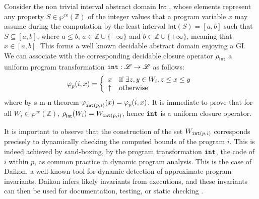 \documentclass[runningheads]{llncs}
\def\ok#1{\mbox{\raisebox{0ex}[1ex][1ex]{$#1$}}}
\def\wpre{\wp^{\text{ce}}}
\newcommand{\ccL}{\mathscr{L}}
\newcommand{\pfunction}[3]{\ok{\varphi^{#2\, #3}_{#1}}}
\newcommand{\auco}[2]{\ok{\rho^{#1}_{#2}}}
\newcommand{\ra}{\rightarrow}
\newcommand{\integer}{\mathbb{Z}}
\def\ok#1{\mbox{\raisebox{0ex}[1ex][1ex]{$#1$}}}
\begin{document}
\smallskip

\begin{example}
    Consider the non trivial interval abstract domain $\mathsf{Int}$ \cite{CC77}, whose elements represent any property $S\in\wpre(\integer)$ of the integer values that a program variable $x$ may assume during the computation by the least interval $\mathsf{Int}(S)=[a,b]$ such that $S\subseteq [a,b]$, where $a\leq b$, $a\in\integer\cup\{-\infty\}$ and $b\in\integer\cup\{+\infty\}$, meaning that $x\in[a,b]$. This forms a well known decidable abstract domain enjoying a GI. We can associate with the corresponding decidable closure operator $\auco{}{\mathsf{Int}}$ a uniform program transformation ${\tt int}:\ccL\ra\ccL$ as follows:
    \[
    \pfunction{p}{}{}(i,x)=\left\{
    \begin{array}{ll}
      x & \mbox{if $\exists z,y\in W_i.\, z\leq x\leq y$}\\
      \uparrow & \mbox{otherwise}
    \end{array}
    \right .
    \]
    where by s-m-n theorem $\pfunction{{\tt int}(p,i)}{}{}(x)=\pfunction{p}{}{}(i,x)$. It is immediate to prove that for all $W_i\in\wpre(\integer)$, $\auco{}{\mathsf{Int}}(W_i)=W_{{\tt int}(p,i)}$, hence ${\tt int}$ is a uniform closure operator.
\end{example}

It is important to observe that the construction of the set $W_{{\tt int}(p,i)}$ corresponds precisely to dynamically checking the computed bounds of the program $i$. This is indeed achieved by sand-boxing, by the program transformation ${\tt int}$, the code of $i$ within $p$, as common practice in dynamic program analysis. This is the case of Daikon, a well-known tool for dynamic detection of approximate program invariants. Daikon infers likely invariants from executions, and these invariants can then be used for documentation, testing, or static checking \cite{Ernst-Daikon}.
\end{document}
